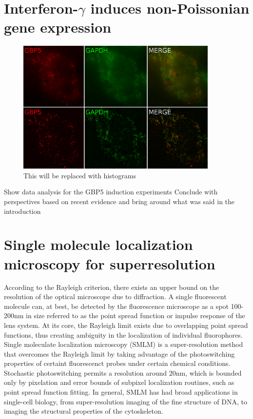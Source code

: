 \documentclass{article}
\begin{document}
\section{Interferon-$\gamma$ induces non-Poissonian gene expression}

\begin{figure}
\centering
\includegraphics[width=10cm]{Stains.png}
\caption{This will be replaced with histograms}
\end{figure}

Show data analysis for the GBP5 induction experiments
Conclude with perspectives based on recent evidence and bring around what was said in the introduction

\section{Single molecule localization microscopy for superresolution}

According to the Rayleigh criterion, there exists an upper bound on the resolution of the optical microscope due to diffraction. A single fluorescent molecule can, at best, be detected by the fluorescence microscope as a spot 100-200nm in size referred to as the point spread function or impulse response of the lens system. At its core, the Rayleigh limit exists due to overlapping point spread functions, thus creating ambiguity in the localization of individual fluorophores. Single moleculate localization microscopy (SMLM) is a super-resolution method that overcomes the Rayleigh limit by taking advantage of the photoswitching properties of certaint fluorescenct probes under certain chemical conditions. Stochastic photoswitching permits a resolution around 20nm, which is bounded only by pixelation and error bounds of subpixel localization routines, such as point spread function fitting. In general, SMLM has had broad applications in single-cell biology, from super-resolution imaging of the fine structure of DNA, to imaging the structural properties of the cytoskeleton.
\end{document}
